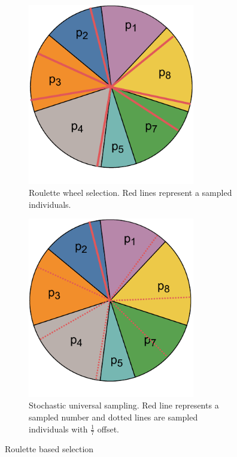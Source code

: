 \begin{figure}
    \begin{subfigure}[t]{0.47\textwidth}
        \includegraphics[width=0.8\textwidth]{img/master_roulettewheel.pdf}
        \caption{Roulette wheel selection. Red lines represent a sampled individuals.}
        \label{fig:roulettewheelselection}
    \end{subfigure}
    \hfill
    \begin{subfigure}[t]{0.47\textwidth}
        \includegraphics[width=0.8\textwidth]{img/master_stochasticuniversalsampling.pdf}
        \caption{Stochastic universal sampling. Red line represents a sampled number and dotted lines are sampled individuals with $\frac{1}{7}$ offset.}
        \label{fig:USB}
    \end{subfigure}
    \caption{Roulette based selection}
\end{figure}


